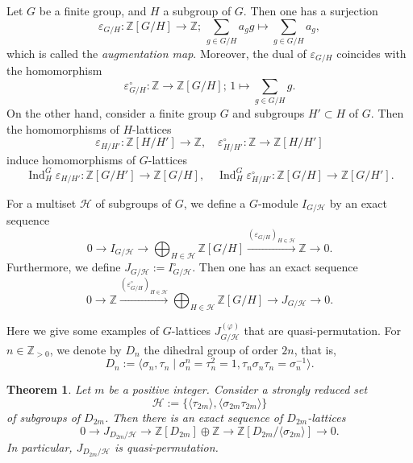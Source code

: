 \documentclass[10pt,a4paper]{amsart}
\newtheorem{thm}{Theorem}
\newcommand{\Z}{\mathbb{Z}}
\newcommand{\Zpn}{\mathbb{Z}_{>0}}
\newcommand{\cH}{\mathcal{H}}
\DeclareMathOperator{\Ind}{Ind}
\begin{document}
Let $G$ be a finite group, and $H$ a subgroup of $G$. Then one has a surjection
\begin{equation*}
    \varepsilon_{G/H}\colon \Z[G/H]\rightarrow \Z;\,\sum_{g \in G/H} a_g g\mapsto \sum_{g \in G/H} a_g, 
\end{equation*}
which is called the \emph{augmentation map}. Moreover, the dual of $\varepsilon_{G/H}$ coincides with the homomorphism
\begin{equation*}
    \varepsilon_{G/H}^{\circ}\colon \Z\rightarrow \Z[G/H];\,1\mapsto \sum_{g\in G/H}g. 
\end{equation*}
On the other hand, consider a finite group $G$ and subgroups $H'\subset H$ of $G$. Then the homomorphisms of $H$-lattices
\begin{equation*}
   \varepsilon_{H/H'}\colon \Z[H/H']\rightarrow \Z,\quad \varepsilon_{H/H'}^{\circ}\colon \Z \rightarrow \Z[H/H']
\end{equation*}
induce homomorphisms of $G$-lattices
\begin{equation*}
   \Ind_{H}^{G}\varepsilon_{H/H'}\colon \Z[G/H']\rightarrow \Z[G/H],\quad \Ind_{H}^{G}\varepsilon_{H/H'}^{\circ}\colon \Z[G/H] \rightarrow \Z[G/H']. 
\end{equation*}

For a multiset $\cH$ of subgroups of $G$, we define a $G$-module $I_{G/\cH}$ by an exact sequence
\begin{equation*}
    0\rightarrow I_{G/\cH}\rightarrow \bigoplus_{H\in \cH}\Z[G/H]\xrightarrow{(\varepsilon_{G/H})_{H\in \cH}} \Z \rightarrow 0. 
\end{equation*}
Furthermore, we define $J_{G/\cH}:=I_{G/\cH}^{\circ}$. Then one has an exact sequence
\begin{equation*}
    0\rightarrow \Z \xrightarrow{(\varepsilon_{G/H}^{\circ})_{H\in \cH}} \bigoplus_{H\in \cH}\Z[G/H] \rightarrow J_{G/\cH} \rightarrow 0. 
\end{equation*}

Here we give some examples of $G$-lattices $J_{G/\cH}^{(\varphi)}$ that are quasi-permutation. For $n\in \Zpn$, we denote by $D_{n}$ the dihedral group of order $2n$, that is, 
\begin{equation*}
D_{n}:=\langle \sigma_{n},\tau_{n} \mid \sigma_{n}^{n}=\tau_{n}^{2}=1,\tau_{n}\sigma_{n}\tau_{n}=\sigma_{n}^{-1}\rangle. 
\end{equation*}

\begin{thm}\label{thm:dnqp}
Let $m$ be a positive integer. Consider a strongly reduced set 
\begin{equation*}
\cH:=\{\langle \tau_{2m} \rangle, \langle \sigma_{2m}\tau_{2m} \rangle \}
\end{equation*}
of subgroups of $D_{2m}$. Then there is an exact sequence of $D_{2m}$-lattices 
\begin{equation*}
    0\rightarrow J_{D_{2m}/\cH}\rightarrow \Z[D_{2m}]\oplus \Z \rightarrow \Z[D_{2m}/\langle \sigma_{2m} \rangle]\rightarrow 0. 
\end{equation*}
In particular, $J_{D_{2m}/\cH}$ is quasi-permutation. 
\end{thm}
\end{document}
